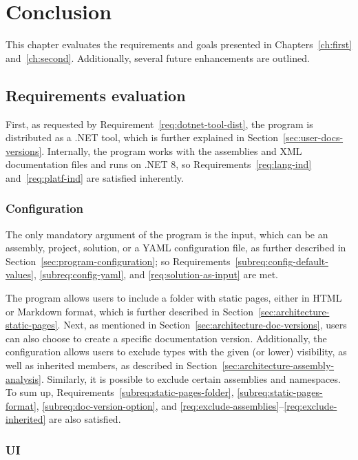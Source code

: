 \chapter*{Conclusion}

This chapter evaluates the requirements and goals presented in Chapters~\ref{ch:first} and~\ref{ch:second}.
Additionally, several future enhancements are outlined.

\section*{Requirements evaluation}
First, as requested by Requirement~\ref{req:dotnet-tool-dist}, the program is distributed as a .NET tool, which is further explained in Section~\ref{sec:user-docs-versions}. 
Internally, the program works with the assemblies and XML documentation files and runs on .NET 8, so Requirements~\ref{req:lang-ind} and~\ref{req:platf-ind} are satisfied inherently.

\subsection*{Configuration}

The only mandatory argument of the program is the input, which can be an assembly, project, solution, or a YAML configuration file, as further described in Section~\ref{sec:program-configuration}; so Requirements~\ref{subreq:config-default-values}, \ref{subreq:config-yaml}, and \ref{req:solution-as-input} are met.

The program allows users to include a folder with static pages, either in HTML or Markdown format, which is further described in Section~\ref{sec:architecture-static-pages}.
Next, as mentioned in Section~\ref{sec:architecture-doc-versions}, users can also choose to create a specific documentation version.
Additionally, the configuration allows users to exclude types with the given (or lower) visibility, as well as inherited members, as described in Section~\ref{sec:architecture-assembly-analysis}. Similarly, it is possible to exclude certain assemblies and namespaces.
To sum up, Requirements~\ref{subreq:static-pages-folder}, \ref{subreq:static-pages-format},
\ref{subreq:doc-version-option}, and \ref{req:exclude-assemblies}--\ref{req:exclude-inherited} are also satisfied.

\subsection*{UI}

